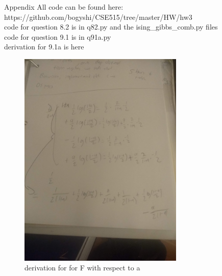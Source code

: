 \documentclass[12pt]{article}
\begin{document}
\begin{section}{Appendix}
	All code can be found here: https://github.com/bogyshi/CSE515/tree/master/HW/hw3
	\\
	code for question 8.2 is in q82.py and the ising\_gibbs\_comb.py files
	\\
	code for question 9.1 is in q91a.py
	\\
	derivation for 9.1a is here
	\begin{figure}[H]
		\includegraphics[width=0.7\textwidth]{derivation.jpg}
		\caption{derivation for for F with respect to a}
	\end{figure}
\end{section}
\end{document}
